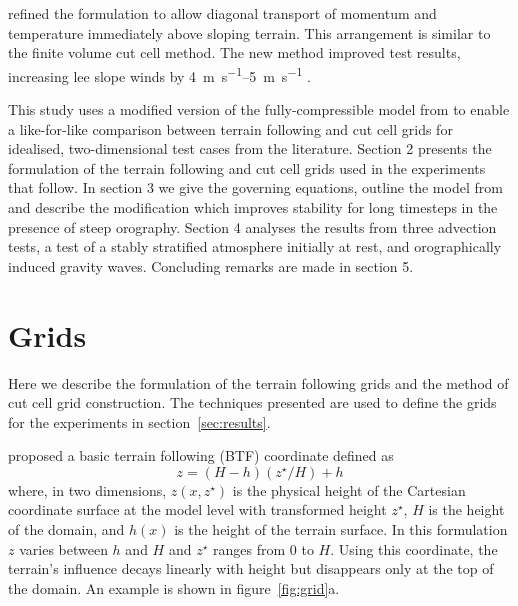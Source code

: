 \documentclass{ametsoc}
\begin{document}
\citet{mesinger2012} refined the formulation to allow diagonal transport of momentum and temperature immediately above sloping terrain.  This arrangement is similar to the finite volume cut cell method.  The new method improved test results, increasing lee slope winds by \SIrange{4}{5}{\meter\per\second} \citep{mesinger2012}.

This study uses a modified version of the fully-compressible model from \citet{weller-shahrokhi2014} to enable a like-for-like comparison between terrain following and cut cell grids for idealised, two-dimensional test cases from the literature.  Section 2 presents the formulation of the terrain following and cut cell grids used in the experiments that follow.  In section 3 we give the governing equations, outline the model from \citet{weller-shahrokhi2014} and describe the modification which improves stability for long timesteps in the presence of steep orography.  Section 4 analyses the results from three advection tests, a test of a stably stratified atmosphere initially at rest, and orographically induced gravity waves.  Concluding remarks are made in section 5.


\section{Grids}
\label{sec:grid}

Here we describe the formulation of the terrain following grids and the method of cut cell grid construction.  The techniques presented are used to define the grids for the experiments in section~\ref{sec:results}.

\citet{galchen-somerville1975} proposed a basic terrain following (BTF) coordinate defined as 
\begin{equation}
	z = \left( H - h \right) \left( z^\star / H \right) + h \label{eqn:btf}
\end{equation}
where, in two dimensions, \(z(x, z^\star)\) is the physical height of the Cartesian coordinate surface at the model level with transformed height \(z^\star\), \(H\) is the height of the domain, and \(h(x)\) is the height of the terrain surface.  In this formulation $z$ varies between $h$ and $H$ and $z^\star$ ranges from 0 to $H$.  Using this coordinate, the terrain's influence decays linearly with height but disappears only at the top of the domain.  An example is shown in figure~\ref{fig:grid}a.
\end{document}
